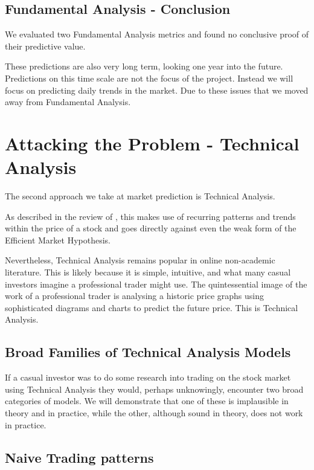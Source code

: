 \documentclass{report}
\begin{document}
\section{Fundamental Analysis - Conclusion}

We evaluated two Fundamental Analysis metrics and found no conclusive proof of their predictive value.  

These predictions are also very long term, looking one year into the future. Predictions on this time scale are not the focus of the project. Instead we will focus on predicting daily trends in the market. Due to these issues that we moved away from Fundamental Analysis.

\chapter{Attacking the Problem - Technical Analysis}

The second approach we take at market prediction is Technical Analysis. 

As described in the review of \citet{kara2011predicting}, this makes use of recurring patterns and trends within the price of a stock and goes directly against even the weak form of the Efficient Market Hypothesis. 

Nevertheless, Technical Analysis remains popular in online non-academic literature. This is likely because it is simple, intuitive, and what many casual investors imagine a professional trader might use. The quintessential image of the work of a professional trader is analysing a historic price graphs using sophisticated diagrams and charts to predict the future price. This is Technical Analysis.

\section{Broad Families of Technical Analysis Models}

If a casual investor was to do some research into trading on the stock market using Technical Analysis they would, perhaps unknowingly, encounter two broad categories of models. We will demonstrate that one of these is implausible in theory and in practice, while the other, although sound in theory, does not work in practice.

\section{Naive Trading patterns}
\end{document}
